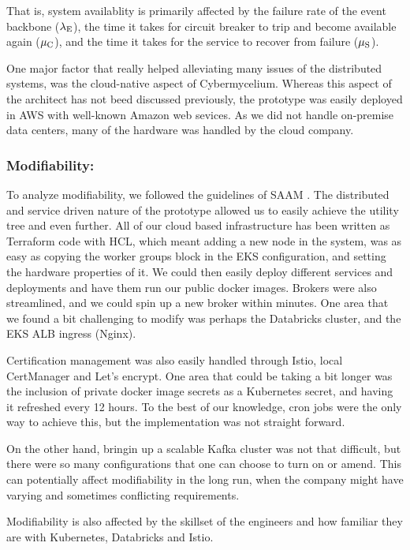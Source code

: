 \documentclass[review]{elsarticle}
\begin{document}
That is, system availablity is primarily affected by the failure rate of the event backbone ($\lambda \textsubscript{E}$), the time it takes for circuit breaker to trip and become available again ($\mu\textsubscript{C}$), and the time it takes for the service to recover from failure ($\mu\textsubscript{S}$).

One major factor that really helped alleviating many issues of the distributed systems, was the cloud-native aspect of Cybermycelium. Whereas this aspect of the architect has not beed discussed previously, the prototype was easily deployed in AWS with well-known Amazon web sevices. As we did not handle on-premise data centers, many of the hardware was handled by the cloud company.

\subsubsection{Modifiability:}

To analyze modifiability, we followed the guidelines of SAAM \cite{kazman1994saam}. The distributed and service driven nature of the prototype allowed us to easily achieve the utility tree and even further. All of our cloud based infrastructure has been written as Terraform code with HCL, which meant adding a new node in the system, was as easy as copying the worker groups block in the EKS configuration, and setting the hardware properties of it. We could then easily deploy different services and deployments and have them run our public docker images. Brokers were also streamlined, and we could spin up a new broker within minutes. One area that we found a bit challenging to modify was perhaps the Databricks cluster, and the EKS ALB ingress (Nginx).

Certification management was also easily handled through Istio, local CertManager and Let's encrypt. One area that could be taking a bit longer was the inclusion of private docker image secrets as a Kubernetes secret, and having it refreshed every 12 hours. To the best of our knowledge, cron jobs were the only way to achieve this, but the implementation was not straight forward.

On the other hand, bringin up a scalable Kafka cluster was not that difficult, but there were so many configurations that one can choose to turn on or amend. This can potentially affect modifiability in the long run, when the company might have varying and sometimes conflicting requirements.

Modifiability is also affected by the skillset of the engineers and how familiar they are with Kubernetes, Databricks and Istio.
\end{document}
